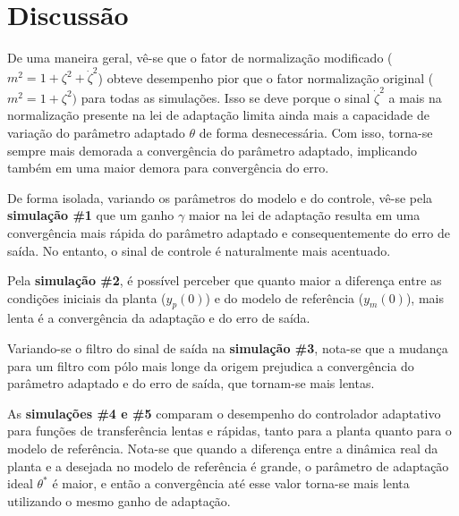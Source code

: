 ﻿%
\section{Discussão}

De uma maneira geral, vê-se que o fator de normalização modificado ($m^2 = 1 + \zeta^2 + \dot{\zeta}^2$) obteve desempenho pior que o fator normalização original ($m^2 = 1 + \zeta^2)$ para todas as simulações. Isso se deve porque o sinal $\dot{\zeta}^2$ a mais na normalização presente na lei de adaptação limita ainda mais a capacidade de variação do parâmetro adaptado $\theta$ de forma  desnecessária. Com isso, torna-se sempre mais demorada a convergência do parâmetro adaptado, implicando também em uma maior demora para convergência do erro.

De forma isolada, variando os parâmetros do modelo e do controle, vê-se pela \textbf{simulação \#1} que um ganho $\gamma$ maior na lei de adaptação resulta em uma convergência mais rápida do parâmetro adaptado e consequentemente do erro de saída. No entanto, o sinal de controle é naturalmente mais acentuado.

Pela \textbf{simulação \#2}, é possível perceber que quanto maior a diferença entre as condições iniciais da planta ($y_p(0)$) e do modelo de referência ($y_m(0)$), mais lenta é a convergência da adaptação e do erro de saída.

Variando-se o filtro do sinal de saída na \textbf{simulação \#3}, nota-se que a mudança para um filtro com pólo mais longe da origem prejudica a convergência do parâmetro adaptado e do erro de saída, que tornam-se mais lentas.

As \textbf{simulações \#4 e \#5} comparam o desempenho do controlador adaptativo para funções de transferência lentas e rápidas, tanto para a planta quanto para o modelo de referência. Nota-se que quando a diferença entre a dinâmica real da planta e a desejada no modelo de referência é grande, o parâmetro de adaptação ideal $\theta^*$ é maior, e então a convergência até esse valor torna-se mais lenta utilizando o mesmo ganho de adaptação.